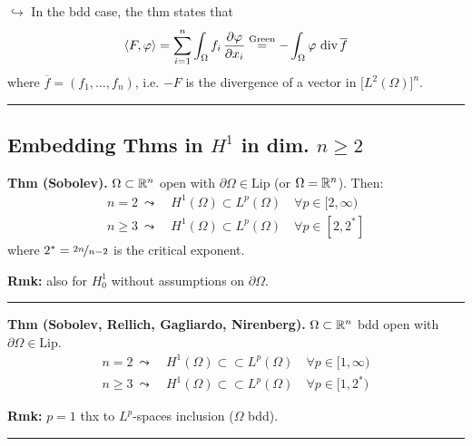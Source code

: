 $\hookrightarrow$ In the bdd case, the thm  states that 
\begin{equation*}
\sca{F,\varphi}=\sum_{i=1}^n \int_\Omega f_i\,\frac{\partial\varphi}{\partial x_i}\overset{\text{Green}}{=}-\int_\Omega \varphi\ \text{div}\,\overline{f}
\end{equation*}
where $\overline{f}=(f_1,\dots,f_n)$, i.e. $-F$ is the divergence of a vector in $\big[L^2(\Omega)\big]^n$.

\rule{0.31\textwidth}{0.2pt}


\subsection{\texorpdfstring{\color{red}Embedding Thms in \texorpdfstring{$H^1$}{C} in dim. \texorpdfstring{$n\geq 2$}{C}}{}}


\textbf{Thm (Sobolev).} $\Omega\subset \mathbb{R}^n$ open with $\partial\Omega\in\text{Lip}$ (or $\Omega=\mathbb{R}^n$). Then:
\begin{align*}
n=2\ \leadsto\ &H^1(\Omega)\subset L^p(\Omega)\quad \forall p\in [2,\infty) \\
n\geq 3\ \leadsto\ &H^1(\Omega)\subset L^p(\Omega)\quad \forall p\in [2,2^*]
\end{align*}
where $2^*=\nicefrac{2n}{n-2}$ is the critical exponent.

\smallskip

\textbf{Rmk:} also for $H^1_0$ without assumptions on $\partial\Omega$.

\rule{0.31\textwidth}{0.2pt}
\smallskip

\textbf{Thm (Sobolev, Rellich, Gagliardo, Nirenberg).} $\Omega\subset \mathbb{R}^n$ bdd open with $\partial\Omega\in\text{Lip}$.
\begin{align*}
n=2\ \leadsto\ &H^1(\Omega)\subset\subset L^p(\Omega)\quad \forall p\in [1,\infty) \\
n\geq 3\ \leadsto\ &H^1(\Omega)\subset\subset L^p(\Omega)\quad \forall p\in [1,2^*)
\end{align*}

\smallskip

\textbf{Rmk:} $p=1$ thx to $L^p$-spaces inclusion ($\Omega$ bdd).

\rule{0.31\textwidth}{0.2pt}


